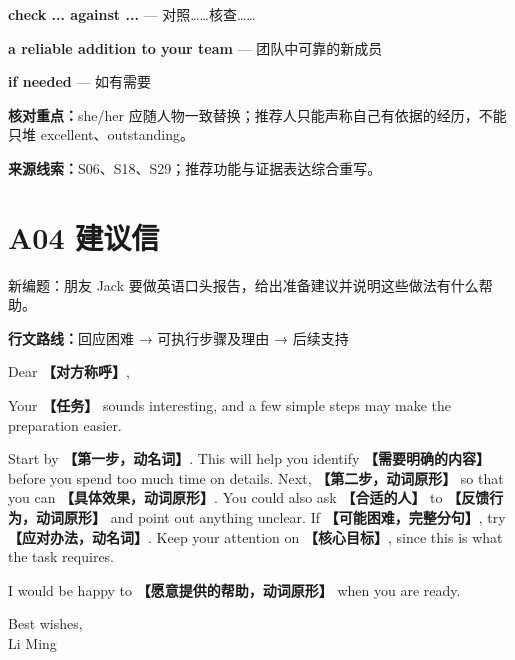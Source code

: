 \documentclass[11pt,a4paper,fontset=macnew]{ctexart}
\newenvironment{writing}{\begingroup\fontsize{10.5}{13.5}\selectfont\setlength{\parskip}{3pt}}{\par\endgroup}
\begin{document}
\par\vspace{4pt}{\bfseries 好词好句：优先记这三处}\par\nopagebreak
{\small\textbf{check ... against ...} — 对照……核查……}\par
{\small\textbf{a reliable addition to your team} — 团队中可靠的新成员}\par
{\small\textbf{if needed} — 如有需要}\par
{\small\textbf{核对重点：}she/her 应随人物一致替换；推荐人只能声称自己有依据的经历，不能只堆 excellent、outstanding。}\par
{\fontsize{8}{10}\selectfont\textbf{来源线索：}S06、S18、S29；推荐功能与证据表达综合重写。}\par
\clearpage\section*{A04  建议信}
{\small 新编题：朋友 Jack 要做英语口头报告，给出准备建议并说明这些做法有什么帮助。}\par
{\small\textbf{行文路线：}回应困难 → 可执行步骤及理由 → 后续支持}\par
\par\vspace{4pt}{\bfseries 可替换模板}\par\nopagebreak
\begin{writing}
\noindent Dear {\bfseries 【对方称呼】},\par
Your {\bfseries 【任务】} sounds interesting, and a few simple steps may make the preparation easier.

Start by {\bfseries 【第一步，动名词】}. This will help you identify {\bfseries 【需要明确的内容】} before you spend too much time on details. Next, {\bfseries 【第二步，动词原形】} so that you can {\bfseries 【具体效果，动词原形】}. You could also ask {\bfseries 【合适的人】} to {\bfseries 【反馈行为，动词原形】} and point out anything unclear. If {\bfseries 【可能困难，完整分句】}, try {\bfseries 【应对办法，动名词】}. Keep your attention on {\bfseries 【核心目标】}, since this is what the task requires.

I would be happy to {\bfseries 【愿意提供的帮助，动词原形】} when you are ready.

\noindent Best wishes,\\Li Ming\par
\end{writing}
\par\vspace{4pt}{\bfseries 完整套用示例}\par\nopagebreak
\end{document}
